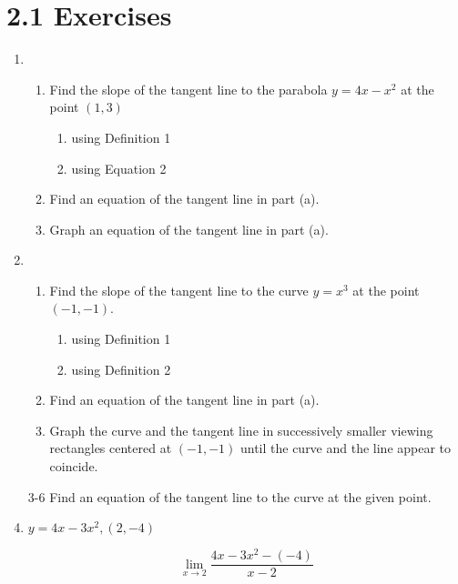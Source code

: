 \documentclass{article}
\begin{document}
	\section{2.1 Exercises}

	\begin{enumerate}
		\item
		\begin{enumerate}
			\item Find the slope of the tangent line to the parabola
				$y = 4x - x^2$ at the point $(1,3)$

			\begin{enumerate}
				\item using Definition 1

				\item using Equation 2
			\end{enumerate}

			\item Find an equation of the tangent line in part (a).

			\item Graph an equation of the tangent line in part (a).
		\end{enumerate}

		\item
		\begin{enumerate}
			\item Find the slope of the tangent line to the curve $y = x^3$ at
				the point $(-1,-1)$.

			\begin{enumerate}
				\item using Definition 1

				\item using Definition 2
			\end{enumerate}

			\item Find an equation of the tangent line in part (a).

			\item Graph the curve and the tangent line in successively smaller
				viewing rectangles centered at $(-1,-1)$ until the curve and
				the line appear to coincide.
		\end{enumerate}

		\item[3-6] Find an equation of the tangent line to the curve at the given point.
		\item $y = 4x - 3x^2, (2, -4)$

			$$\lim \limits _{x \to 2} \frac{4x - 3x^2 - (-4)}{x-2}$$


\end{enumerate}
\end{document}
